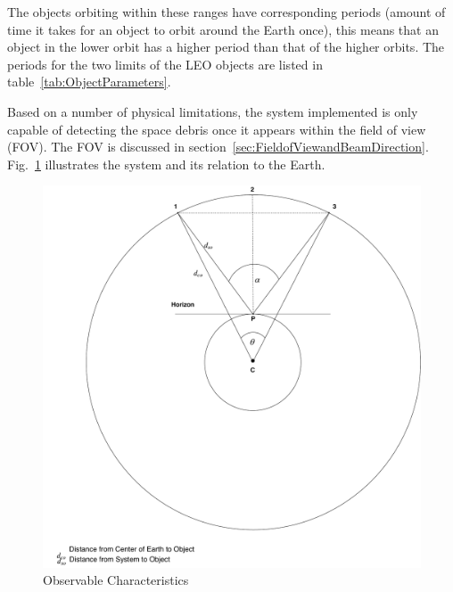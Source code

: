 \documentclass[11pt]{witseiepaper}
\begin{document}
\begin{bibunit}[witseie]



The objects orbiting within these ranges have corresponding periods (amount of time it takes for an object to orbit around the Earth once), this means that an object in the lower orbit has a higher period than that of the higher orbits. The periods for the two limits of the LEO objects are listed in table~\ref{tab:ObjectParameters}.

Based on a number of physical limitations, the system implemented is only capable of detecting the space debris once it appears within the field of view (FOV). The FOV is discussed in section~\ref{sec:FieldofViewandBeamDirection}. Fig.~\ref{fig:ObservableCharacteristics} illustrates the system and its relation to the Earth.


\begin{figure}[htb]
    \centering
    \includegraphics[width=0.5\linewidth]{ObservableCharacteristics.pdf}
    \caption{Observable Characteristics}
    \label{fig:ObservableCharacteristics}
\end{figure}



\end{bibunit}
\end{document}
